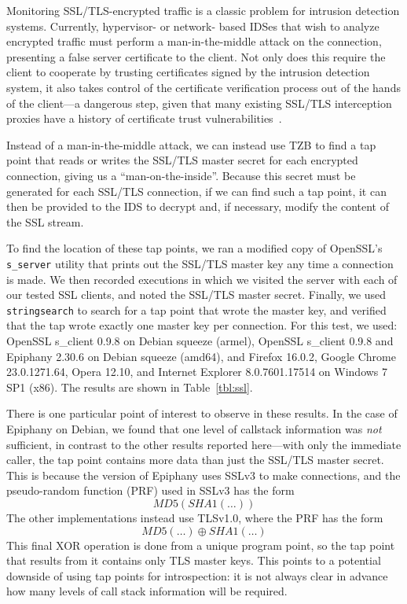 Monitoring SSL/TLS-encrypted traffic is a classic problem for intrusion
detection systems. Currently, hypervisor- or network- based IDSes that
wish to analyze encrypted traffic must perform a man-in-the-middle
attack on the connection, presenting a false server certificate to the
client. Not only does this require the client to cooperate by trusting
certificates signed by the intrusion detection system, it also takes
control of the certificate verification process out of the hands of the
client---a dangerous step, given that many existing SSL/TLS interception
proxies have a history of certificate trust
vulnerabilities~\cite{JarmocBHEU2012}.

Instead of a man-in-the-middle attack, we can instead use TZB to find a
tap point that reads or writes the SSL/TLS master secret for each
encrypted connection, giving us a ``man-on-the-inside''. Because this
secret must be generated for each SSL/TLS connection, if we can find
such a tap point, it can then be provided to the IDS to decrypt and, if
necessary, modify the content of the SSL stream.

To find the location of these tap points, we ran a modified copy of
OpenSSL's \texttt{s\_server} utility that prints out the SSL/TLS master
key any time a connection is made. We then recorded executions in which
we visited the server with each of our tested SSL clients, and noted the
SSL/TLS master secret. Finally, we used \texttt{stringsearch} to search
for a tap point that wrote the master key, and verified that the tap
wrote exactly one master key per connection. For this test, we used:
OpenSSL s\_client 0.9.8 on Debian squeeze (armel), OpenSSL s\_client
0.9.8 and Epiphany 2.30.6 on Debian squeeze (amd64), and Firefox
16.0.2, Google Chrome 23.0.1271.64, Opera 12.10, and Internet Explorer
8.0.7601.17514 on Windows 7 SP1 (x86). The results are shown in
Table~\ref{tbl:ssl}.

There is one particular point of interest to observe in these results.
In the case of Epiphany on Debian, we found that one level of callstack
information was \emph{not} sufficient, in contrast to the other results
reported here---with only the immediate caller, the tap point contains
more data than just the SSL/TLS master secret. This is because the
version of Epiphany uses SSLv3 to make connections, and the
pseudo-random function (PRF) used in SSLv3 has the form
\[ MD5(SHA1(\ldots))\] The other implementations instead use TLSv1.0,
where the PRF has the form \[ MD5(\ldots) \oplus SHA1(\ldots) \] This final
XOR operation is done from a unique program point, so the tap point that
results from it contains only TLS master keys. This points to a
potential downside of using tap points for introspection: it is not
always clear in advance how many levels of call stack information will
be required.

